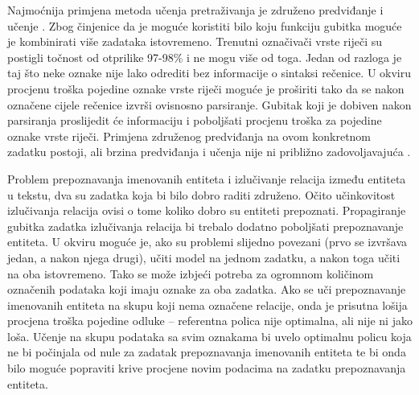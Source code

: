 Najmoćnija primjena metoda učenja pretraživanja je združeno predviđanje i učenje
. Zbog činjenice da je moguće koristiti bilo
koju funkciju gubitka moguće je kombinirati više zadataka istovremeno. Trenutni
označivači vrste riječi su postigli točnost od otprilike 97-98\%
\citep{manning2011part} i ne mogu više od toga. Jedan od razloga je taj što neke
oznake nije lako odrediti bez informacije o sintaksi rečenice. U \lts{} okviru
procjenu troška pojedine oznake vrste riječi moguće je proširiti tako da se
nakon označene cijele rečenice izvrši ovisnosno parsiranje. Gubitak koji je
dobiven nakon parsiranja proslijedit će informaciju i poboljšati procjenu
troška za pojedine oznake vrste riječi. Primjena združenog predviđanja na ovom
konkretnom zadatku postoji, ali brzina predviđanja i učenja nije ni približno
zadovoljavajuća \citep{bohnet2012transition}.

Problem prepoznavanja imenovanih entiteta i izlučivanje relacija između entiteta
u tekstu, dva su zadatka koja bi bilo dobro raditi združeno. Očito učinkovitost
izlučivanja relacija ovisi o tome koliko dobro su entiteti prepoznati.
Propagiranje gubitka zadatka izlučivanja relacija bi trebalo dodatno poboljšati
prepoznavanje entiteta. U \lts{} okviru moguće je, ako su problemi slijedno
povezani (prvo se izvršava jedan, a nakon njega drugi), učiti model na jednom
zadatku, a nakon toga učiti na oba istovremeno. Tako se može izbjeći potreba za
ogromnom količinom označenih podataka koji imaju oznake za oba zadatka. Ako se
uči prepoznavanje imenovanih entiteta na skupu koji nema označene relacije, onda
je prisutna lošija procjena troška pojedine odluke -- referentna polica nije
optimalna, ali nije ni jako loša. Učenje na skupu podataka sa svim oznakama bi
uvelo optimalnu policu koja ne bi počinjala od nule za zadatak prepoznavanja
imenovanih entiteta te bi onda bilo moguće popraviti krive procjene novim
podacima na zadatku prepoznavanja entiteta.

